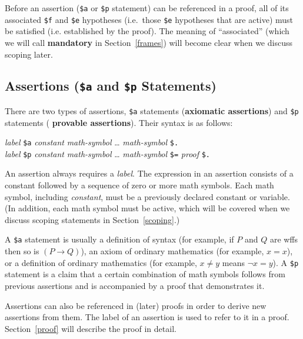 Before an assertion (\texttt{\$a} or \texttt{\$p} statement) can be
referenced in a proof, all of its associated \texttt{\$f} and \texttt{\$e} hypotheses
(i.e.\ those \texttt{\$e} hypotheses that are active) must be satisfied (i.e.
established by the proof).  The meaning of ``associated'' (which we will call
{\bf mandatory} in Section~\ref{frames}) will become clear when we discuss
scoping later.

\subsection{Assertions (\texttt{\$a} and \texttt{\$p} Statements)}

There are two types of assertions, \texttt{\$a}
statements ({\bf axiomatic assertions}) and \texttt{\$p} statements ({\bf
provable assertions}).  Their syntax is as follows:
\begin{center}
  {\em label} \texttt{\$a} {\em constant} {\em math-symbol} \ldots
         {\em math-symbol} \texttt{\$.}\\
  {\em label} \texttt{\$p} {\em constant} {\em math-symbol} \ldots
        {\em math-symbol} \texttt{\$=} {\em proof} \texttt{\$.}
\end{center}
An assertion always requires a {\em label}. The expression in an
assertion consists of a constant followed by a sequence of zero
or more math symbols.  Each math symbol, including {\em constant}, must be a
previously declared constant or variable.  (In addition, each math symbol
must be active, which will be covered when we discuss scoping statements in
Section~\ref{scoping}.)

A \texttt{\$a} statement is usually a definition of syntax (for example, if $P$
and $Q$ are wffs then so is $(P\to Q)$), an axiom of ordinary
mathematics (for example, $x=x$), or a definition of
ordinary mathematics (for example, $x\ne y$ means $\lnot x=y$). A \texttt{\$p}
statement is a claim that a certain combination of math symbols follows from
previous assertions and is accompanied by a proof that demonstrates it.

Assertions can also be referenced in (later) proofs in order to derive new
assertions from them. The label of an assertion is used to refer to it in a
proof. Section~\ref{proof} will describe the proof in detail.

